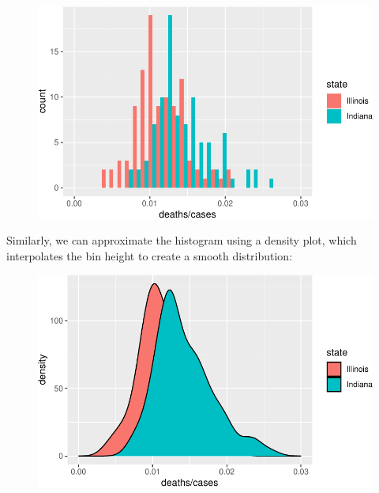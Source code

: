 \documentclass[
  letterpaper,
  DIV=11,
  numbers=noendperiod]{scrreprt}
\newenvironment{Shaded}{\begin{snugshade}}{\end{snugshade}}
\newcommand{\AttributeTok}[1]{\textcolor[rgb]{0.40,0.45,0.13}{#1}}
\newcommand{\CommentTok}[1]{\textcolor[rgb]{0.37,0.37,0.37}{#1}}
\newcommand{\DecValTok}[1]{\textcolor[rgb]{0.68,0.00,0.00}{#1}}
\newcommand{\FloatTok}[1]{\textcolor[rgb]{0.68,0.00,0.00}{#1}}
\newcommand{\FunctionTok}[1]{\textcolor[rgb]{0.28,0.35,0.67}{#1}}
\newcommand{\NormalTok}[1]{\textcolor[rgb]{0.00,0.23,0.31}{#1}}
\newcommand{\SpecialCharTok}[1]{\textcolor[rgb]{0.37,0.37,0.37}{#1}}
\newcommand{\StringTok}[1]{\textcolor[rgb]{0.13,0.47,0.30}{#1}}
\begin{document}
\begin{figure}[H]

{\centering \includegraphics{./01-dataviz_files/figure-pdf/unnamed-chunk-13-1.pdf}

}

\end{figure}

Similarly, we can approximate the histogram using a density plot, which
interpolates the bin height to create a smooth distribution:

\begin{Shaded}
\end{Shaded}

\begin{figure}[H]

{\centering \includegraphics{./01-dataviz_files/figure-pdf/unnamed-chunk-14-1.pdf}

}

\end{figure}
\end{document}
